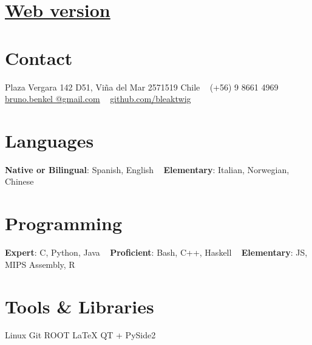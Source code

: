 \documentclass[a4paper]{cv-style}
\begin{document}
\lastupdated

\begin{aside}
    \section{\href{https://bleaktwig.github.io/cv/}{Web version}}
    \section{Contact}
        Plaza Vergara 142 D51,
        Vi\~na del Mar 2571519
        Chile
        ~
        (+56) 9 8661 4969
        ~
        \href{mailto:bruno.benkel@gmail.com}{bruno.benkel
        @gmail.com}
        ~
        \href{https://github.com/bleaktwig}{github.com/bleaktwig}
    \section{Languages}
        \textbf{Native or Bilingual}:
        Spanish, English
        ~
        \textbf{Elementary}:
        Italian, Norwegian, Chinese
    \section{Programming}
        \textbf{Expert}:
        C, Python, Java
        ~
        \textbf{Proficient}:
        Bash, C++, Haskell
        ~
        \textbf{Elementary}:
        JS, MIPS Assembly, R
    \section{Tools \& Libraries}
        Linux
        Git
        ROOT
        \LaTeX{}
        QT + PySide2
\end{aside}

\end{document}
